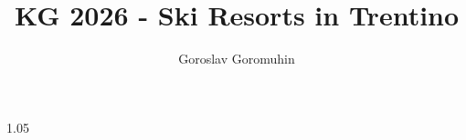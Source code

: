 \documentclass{knowdive}
\title{KG 2026 - Ski Resorts in Trentino}
\author{Goroslav Goromuhin}
\begin{document}
\maketitle
\begin{sloppypar}
\large
\begin{spacing}{1.05}






%

















\end{spacing}
\end{sloppypar}
\end{document}
